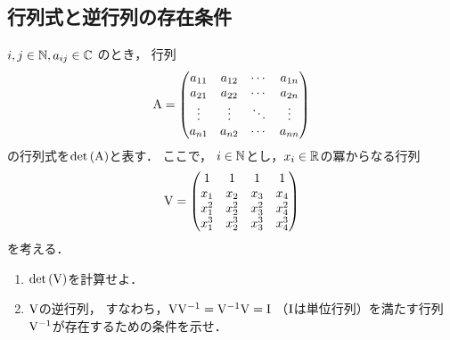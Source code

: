 \subsection{行列式と逆行列の存在条件}
    $i, j \in \mathbb{N}, a_{ij} \in \mathbb{C}$ のとき，
    行列
    \begin{equation}
      \mathrm{A}=
        \begin{pmatrix}
          a_{11} & a_{12} & \cdots & a_{1n} \\
          a_{21} & a_{22} & \cdots & a_{2n} \\
          \vdots & \vdots & \ddots & \vdots \\
          a_{n1} & a_{n2} & \cdots & a_{nn}
        \end{pmatrix}
    \end{equation}
    の行列式を$\det{(\mathrm{A})}$と表す．
    ここで，
    $i \in \mathbb{N}$とし，$x_i \in \mathbb{R}$の冪からなる行列
    \begin{equation}
      \mathrm{V} =
        \begin{pmatrix}
          1 & 1 & 1 & 1 \\
          x_1 & x_2 & x_3 & x_4 \\
          x_1^2 & x_2^2 & x_3^2 & x_4^2 \\
          x_1^3 & x_2^3 & x_3^3 & x_4^3
        \end{pmatrix}
    \end{equation}
    を考える．
    \begin{enumerate}[label=(\roman*)]
      \item $\det{(\mathrm{V})}$を計算せよ．
      \item $\mathrm{V}$の逆行列，
        すなわち，$\mathrm{V}\mathrm{V}^{-1}=\mathrm{V}^{-1}\mathrm{V}=\mathrm{I}$
        （$\mathrm{I}$は単位行列）を満たす行列$\mathrm{V}^{-1}$が存在するための条件を示せ．
    \end{enumerate}

